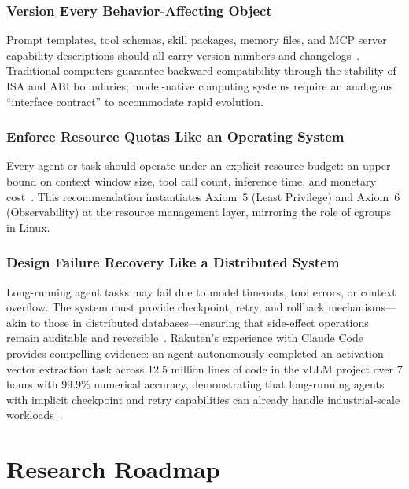 \documentclass[11pt,a4paper]{article}
\begin{document}
\subsubsection{Version Every Behavior-Affecting Object}

Prompt templates, tool schemas, skill packages, memory files, and MCP server capability descriptions should all carry version numbers and changelogs~\cite{mcp_intro_2026,agentprotocols2025}. Traditional computers guarantee backward compatibility through the stability of ISA and ABI boundaries; model-native computing systems require an analogous ``interface contract'' to accommodate rapid evolution.

\subsubsection{Enforce Resource Quotas Like an Operating System}

Every agent or task should operate under an explicit resource budget: an upper bound on context window size, tool call count, inference time, and monetary cost~\cite{linux_cgroup_2026}. This recommendation instantiates Axiom~5 (Least Privilege) and Axiom~6 (Observability) at the resource management layer, mirroring the role of cgroups in Linux.

\subsubsection{Design Failure Recovery Like a Distributed System}

Long-running agent tasks may fail due to model timeouts, tool errors, or context overflow. The system must provide checkpoint, retry, and rollback mechanisms---akin to those in distributed databases---ensuring that side-effect operations remain auditable and reversible~\cite{raft2014,spanner2012}. Rakuten's experience with Claude Code provides compelling evidence: an agent autonomously completed an activation-vector extraction task across 12.5 million lines of code in the vLLM project over 7 hours with 99.9\% numerical accuracy, demonstrating that long-running agents with implicit checkpoint and retry capabilities can already handle industrial-scale workloads~\cite{anthropic2026agenticreport}.




\section{Research Roadmap}
\label{sec:roadmap}
\end{document}
